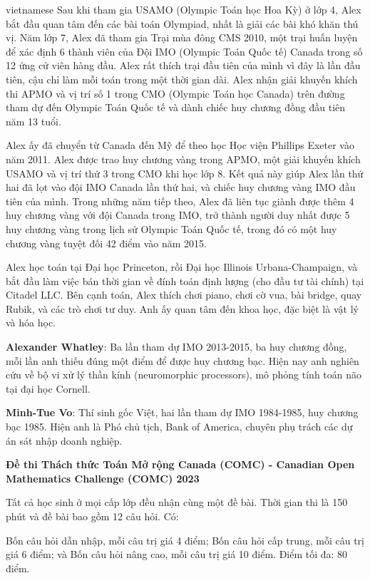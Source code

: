 \documentclass{article}
\begin{document}
\begin{otherlanguage*}{vietnamese}
Sau khi tham gia USAMO (Olympic Toán học Hoa Kỳ) ở lớp 4, Alex bắt đầu quan tâm đến các bài toán Olympiad, nhất là giải các bài khó khăn thú vị.
Năm lớp 7, Alex đã tham gia Trại mùa đông CMS 2010, một trại huấn luyện để xác định 6 thành viên của Đội IMO (Olympic Toán Quốc tế) Canada trong số 12 ứng cử viên hàng đầu.
Alex rất thích trại đầu tiên của mình vì đây là lần đầu tiên, cậu chỉ làm mỗi toán trong một thời gian dài.
Alex nhận giải khuyến khích thi APMO và vị trí số 1 trong CMO (Olympic Toán học Canada) trên đường tham dự đến Olympic Toán Quốc tế và dành chiếc huy chương đồng đầu tiên năm 13 tuổi.

Alex ấy đã chuyển từ Canada đến Mỹ để theo học Học viện Phillips Exeter vào năm 2011. Alex được trao huy chương vàng trong APMO, một giải khuyến khích USAMO và vị trí thứ 3 trong CMO khi học lớp 8.
Kết quả này giúp Alex lần thứ hai đã lọt vào đội IMO Canada lần thứ hai, và chiếc huy chương vàng IMO đầu tiên của mình.
Trong những năm tiếp theo, Alex đã liên tục giành được thêm 4 huy chương vàng với đội Canada trong IMO, trở thành người duy nhất được 5 huy chương vàng trong lịch sử Olympic Toán Quốc tế,
trong đó có một huy chương vàng tuyệt đối 42 điểm vào năm 2015.

Alex học toán tại Đại học Princeton, rồi Đại học Illinois Urbana-Champaign, và bắt đầu làm việc bán thời gian về đính toán định lượng (cho đầu tư tài chính) tại Citadel LLC.
Bên cạnh toán, Alex thích chơi piano, chơi cờ vua, bài bridge, quay Rubik, và các trò chơi tư duy. Anh ấy quan tâm đến khoa học, đặc biệt là vật lý và hóa học.

\textbf{Alexander Whatley}: Ba lần tham dự IMO 2013-2015, ba huy chương đồng, mỗi lần anh thiếu đúng một điểm để được huy chương bạc.
Hiện nay anh nghiên cứu về bộ vi xử lý thần kính (neuromorphic processors), mô phỏng tính toán não tại đại học Cornell.

\textbf{Minh-Tue Vo}: Thí sinh gốc Việt, hai lần tham dự IMO 1984-1985, huy chương bạc 1985. Hiện anh là Phó chủ tịch, Bank of America, chuyên phụ trách các dự án sát nhập doanh nghiệp.

\newpage
\textbf{Đề thi Thách thức Toán Mở rộng Canada (COMC) - Canadian Open Mathematics Challenge (COMC) 2023}

Tất cả học sinh ở mọi cấp lớp đều nhận cùng một đề bài. Thời gian thi là 150 phút và đề bài bao gồm 12 câu hỏi. Có:
\begin{itemize}[topsep=0pt, partopsep=0pt, itemsep=0pt]
    \ii Bốn câu hỏi dẫn nhập, mỗi câu trị giá 4 điểm;
    \ii Bốn câu hỏi cấp trung, mỗi câu trị giá 6 điểm; và
    \ii Bốn câu hỏi nâng cao, mỗi câu trị giá 10 điểm.
    \ii Điểm tối đa: 80 điểm.
\end{itemize}


\end{otherlanguage*}
\end{document}
